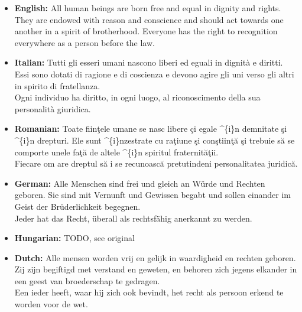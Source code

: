 \documentclass[a4paper, 9pt]{article}
\begin{document}
\begin{mdframed}
  \begin{itemize}[leftmargin=1em]
  \item \textbf{English:}
  All human beings are born free and equal in dignity
  and rights. They are endowed with reason and conscience and should act
  towards one another in a spirit of brotherhood.
  Everyone has the right to recognition everywhere as a person before the
  law.
  
  \item \textbf{Italian:} 
  Tutti gli esseri umani nascono liberi ed eguali in
  dignità e diritti. Essi sono dotati di ragione e di coscienza e devono
  agire gli uni verso gli altri in spirito di fratellanza.\\
  Ogni individuo ha diritto, in ogni luogo, al riconoscimento della sua
  personalità giuridica.
  
  \item \textbf{Romanian:}
  Toate fiin\c{t}ele umane se nasc libere \c{c}i egale
  \^{}\{i\}n demnitate \c{s}i \^{}\{i\}n drepturi. Ele sunt
  \^{}\{i\}nzestrate cu ra\c{t}iune \c{s}i con\c{s}tiin\c{t}ă \c{s}i
  trebuie s\u{a} se comporte unele fa\c{t}\u{a} de altele \^{}\{i\}n
  spiritul fraternit\u{a}\c{t}ii.\\
  Fiecare om are dreptul s\u{a} i se recunoasc\u{a} pretutindeni
  personalitatea juridic\u{a}.
  
  \item \textbf{German:}
  Alle Menschen sind frei und gleich an W\"urde und
  Rechten geboren. Sie sind mit Vernunft und Gewissen begabt und sollen
  einander im Geist der Br\"uderlichkeit begegnen.\\
  Jeder hat das Recht, überall als rechtsfähig anerkannt zu werden.
  
  \item \textbf{Hungarian:} TODO, see original
  
  \item \textbf{Dutch:} Alle mensen worden vrij en gelijk in waardigheid en
  rechten geboren. Zij zijn begiftigd met verstand en geweten, en behoren
  zich jegens elkander in een geest van broederschap te gedragen.\\
  Een ieder heeft, waar hij zich ook bevindt, het recht als persoon erkend
  te worden voor de wet.
  \end{itemize}
\end{mdframed}
\end{document}
